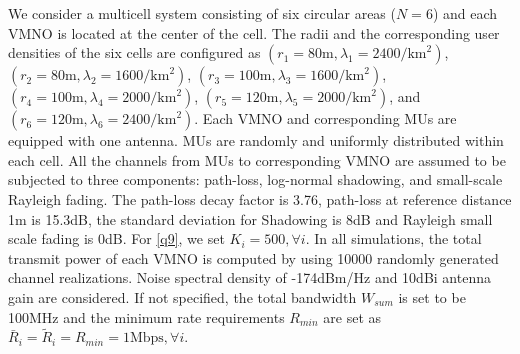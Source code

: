 \documentclass[journal]{IEEEtran}
\begin{document}
We consider a multicell system consisting of six circular areas ($N = 6$) and each VMNO is located at the center of the cell. The radii and the corresponding user densities of the six cells are configured as $(r_1 = 80\mbox{m}, \lambda_1 = 2400/\mbox{km}^2)$, $(r_2 = 80\mbox{m}, \lambda_2 = 1600/\mbox{km}^2)$, $(r_3 = 100\mbox{m}, \lambda_3 = 1600/\mbox{km}^2)$, $(r_4 = 100\mbox{m}, \lambda_4 = 2000/\mbox{km}^2)$, $(r_5 = 120\mbox{m}, \lambda_5 = 2000/\mbox{km}^2)$, and $(r_6 = 120\mbox{m}, \lambda_6 = 2400/\mbox{km}^2)$. Each VMNO and corresponding MUs are equipped with one antenna. MUs are randomly and uniformly distributed within each cell. All the channels from MUs to corresponding VMNO are assumed to be subjected to three components: path-loss, log-normal shadowing, and small-scale Rayleigh fading. The path-loss decay factor is 3.76, 
path-loss at reference distance 1m is 15.3dB, the standard deviation for Shadowing is 8dB and Rayleigh small scale fading is 0dB. For \eqref{q9}, we set $K_i = 500, \forall i$. In all simulations, the total transmit power of each VMNO is computed by using 10000 randomly generated channel realizations. Noise spectral density of -174dBm/Hz and 10dBi antenna gain are considered. If not specified, the total bandwidth $W_{sum}$ is set to be 100MHz and the minimum rate requirements $R_{min}$ are set as $\bar{R}_i = \tilde{R}_i = R_{min} = 1\mbox{Mbps}, \forall i$.
\end{document}
